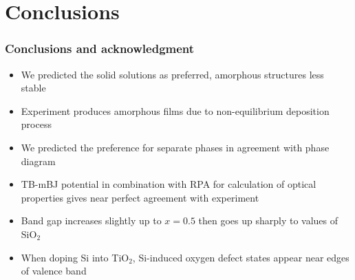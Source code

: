 \documentclass[noamsthm,8pt,t]{beamer}
\begin{document}
\section{Conclusions}
\begin{frame}
   \frametitle{Conclusions and acknowledgment}
   \begin{itemize}
      \item We predicted the solid solutions as preferred, amorphous structures less stable
      \item Experiment produces amorphous films due to non-equilibrium deposition process
      \item We predicted the preference for separate phases in agreement with phase diagram 
      \item<2-> TB-mBJ potential in combination with RPA for calculation of optical properties gives near perfect agreement with experiment
      \item<2-> Band gap increases slightly up to $x = 0.5$ then goes up sharply to values of SiO$_2$
      \item<2-> When doping Si into TiO$_2$, Si-induced oxygen defect states appear near edges of valence band
   \end{itemize}

   \vspace{0.5cm}

\end{frame}
\end{document}
